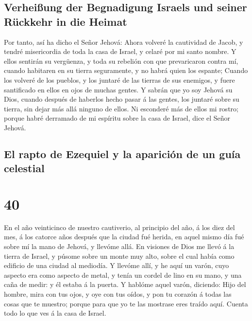 \hypertarget{verheiuxdfung-der-begnadigung-israels-und-seiner-ruxfcckkehr-in-die-heimat}{%
\subsection{Verheißung der Begnadigung Israels und seiner Rückkehr in
die
Heimat}\label{verheiuxdfung-der-begnadigung-israels-und-seiner-ruxfcckkehr-in-die-heimat}}

 Por tanto, así ha dicho el Señor Jehová: Ahora volveré
la cautividad de Jacob, y tendré misericordia de toda la casa de Israel,
y celaré por mi santo nombre.  Y ellos sentirán su
vergüenza, y toda su rebelión con que prevaricaron contra mí, cuando
habitaren en su tierra seguramente, y no habrá quien los espante;
 Cuando los volveré de los pueblos, y los juntaré de las
tierras de sus enemigos, y fuere santificado en ellos en ojos de muchas
gentes.  Y sabrán que yo soy Jehová su Dios, cuando
después de haberlos hecho pasar á las gentes, los juntaré sobre su
tierra, sin dejar más allá ninguno de ellos.  Ni
esconderé más de ellos mi rostro; porque habré derramado de mi espíritu
sobre la casa de Israel, dice el Señor Jehová.

\hypertarget{el-rapto-de-ezequiel-y-la-apariciuxf3n-de-un-guuxeda-celestial}{%
\subsection{El rapto de Ezequiel y la aparición de un guía
celestial}\label{el-rapto-de-ezequiel-y-la-apariciuxf3n-de-un-guuxeda-celestial}}

\hypertarget{section-39}{%
\section{40}\label{section-39}}

 En el año veinticinco de nuestro cautiverio, al principio
del año, á los diez del mes, á los catorce años después que la ciudad
fué herida, en aquel mismo día fué sobre mí la mano de Jehová, y llevóme
allá.  En visiones de Dios me llevó á la tierra de Israel,
y púsome sobre un monte muy alto, sobre el cual había como edificio de
una ciudad al mediodía.  Y llevóme allí, y he aquí un
varón, cuyo aspecto era como aspecto de metal, y tenía un cordel de lino
en su mano, y una caña de medir: y él estaba á la puerta. 
Y hablóme aquel varón, diciendo: Hijo del hombre, mira con tus ojos, y
oye con tus oídos, y pon tu corazón á todas las cosas que te muestro;
porque para que yo te las mostrase eres traído aquí. Cuenta todo lo que
ves á la casa de Israel.


